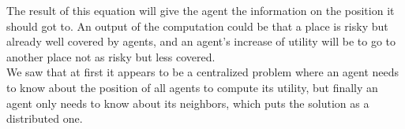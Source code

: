 The result of this equation will give the agent the information on the position it should got to. An output of the computation could be that a place is risky but already well covered by agents, and an agent's increase of utility will be to go to another place not as risky but less covered. \\
We saw that at first it appears to be a centralized problem where an agent needs to know about the position of all agents to compute its utility, but finally an agent only needs to know about its neighbors, which puts the solution as a distributed one.
